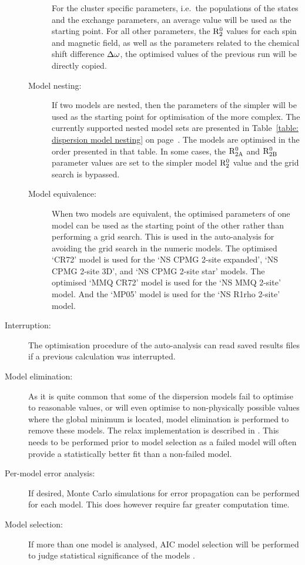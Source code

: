 \begin{description}
\begin{description}
      For the cluster specific parameters, i.e.\ the populations of the states and the exchange parameters, an average value will be used as the starting point.
      For all other parameters, the $\mathrm{R}_2^0$ values for each spin and magnetic field, as well as the parameters related to the chemical shift difference $\Delta\omega$, the optimised values of the previous run will be directly copied.
    \item[Model nesting:]  If two models are nested, then the parameters of the simpler will be used as the starting point for optimisation of the more complex.
      The currently supported nested model sets are presented in Table~\ref{table: dispersion model nesting} on page~\pageref{table: dispersion model nesting}.
      The models are optimised in the order presented in that table.
      In some cases, the $\mathrm{R}_{\mathrm{2A}}^0$ and $\mathrm{R}_{\mathrm{2B}}^0$ parameter values are set to the simpler model $\mathrm{R}_2^0$ value and the grid search is bypassed.
    \item[Model equivalence:]  When two models are equivalent, the optimised parameters of one model can be used as the starting point of the other rather than performing a grid search.
      This is used in the auto-analysis for avoiding the grid search in the numeric models.
      The optimised `CR72' model is used for the `NS CPMG 2-site expanded', `NS CPMG 2-site 3D', and  `NS CPMG 2-site star' models.
      The optimised `MMQ CR72' model is used for the `NS MMQ 2-site' model.
      And the `MP05' model is used for the `NS R1rho 2-site' model.
  \end{description}
  \item[Interruption:]  The optimisation procedure of the auto-analysis can read saved results files if a previous calculation was interrupted.
  \item[Model elimination:]  As it is quite common that some of the dispersion models fail to optimise to reasonable values, or will even optimise to non-physically possible values where the global minimum is located, model elimination is performed to remove these models.
    The relax implementation is described in \citet{dAuvergneGooley06}.
    This needs to be performed prior to model selection as a failed model will often provide a statistically better fit than a non-failed model.
  \item[Per-model error analysis:]  If desired, Monte Carlo simulations for error propagation can be performed for each model.
    This does however require far greater computation time.
  \item[Model selection:]  If more than one model is analysed, AIC model selection will be performed to judge statistical significance of the models \citep{Akaike73}.

\end{description}
